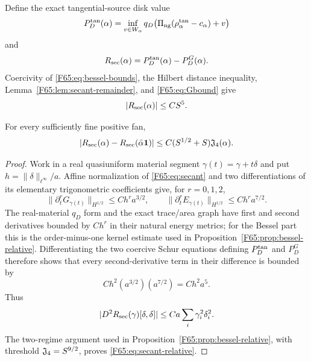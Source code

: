Define the exact tangential-source disk value
\begin{equation}\label{F65:eq:PDtan}
 P_D^{\rm tan}(\alpha)
 =\inf_{v\in W_\alpha}
 q_D\bigl(\Pi_{\rm ng}(\rho_\alpha^{\rm tan}-c_\alpha)+v\bigr)
\end{equation}
and
\begin{equation}
 R_{\rm sec}(\alpha)=P_D^{\rm tan}(\alpha)-P_D^G(\alpha).
\end{equation}
Coercivity of \eqref{F65:eq:bessel-bounds}, the Hilbert distance inequality,
Lemma~\ref{F65:lem:secant-remainder}, and \eqref{F65:eq:Gbound} give
\begin{equation}\label{F65:eq:secant-absolute}
 |R_{\rm sec}(\alpha)|\le CS^5.
\end{equation}

\begin{lemma}\label{F65:lem:secant-relative}
For every sufficiently fine positive fan,
\begin{equation}\label{F65:eq:secant-relative}
 |R_{\rm sec}(\alpha)-R_{\rm sec}(\bar\alpha\mathbf1)|
 \le C(S^{1/2}+S)\mathfrak J_4(\alpha).
\end{equation}
\end{lemma}

\begin{proof}
Work in a real quasiuniform material segment
$\gamma(t)=\gamma+t\delta$ and put
$h=\|\delta\|_{\ell^\infty}/a$.  Affine normalization of
\eqref{F65:eq:secant} and two differentiations of its elementary trigonometric
coefficients give, for $r=0,1,2$,
\begin{equation}
 \|\partial_t^rG_{\gamma(t)}\|_{H^{1/2}}
 \le Ch^ra^{3/2},
 \qquad
 \|\partial_t^rE_{\gamma(t)}\|_{H^{1/2}}
 \le Ch^ra^{7/2}.
\end{equation}
The real-material $q_D$ form and the exact trace/area graph have first and
second derivatives bounded by $Ch^r$ in their natural energy metrics; for
the Bessel part this is the order-minus-one kernel estimate used in
Proposition~\ref{F65:prop:bessel-relative}.  Differentiating the two coercive
Schur equations defining $P_D^{\rm tan}$ and $P_D^G$ therefore shows that
every second-derivative term in their difference is bounded by
\begin{equation}
 Ch^2(a^{3/2})(a^{7/2})=Ch^2a^5.
\end{equation}
Thus
\begin{equation}
 |D^2R_{\rm sec}(\gamma)[\delta,\delta]|
 \le Ca\sum_i\gamma_i^2\delta_i^2.
\end{equation}
The two-regime argument used in Proposition~\ref{F65:prop:bessel-relative},
with threshold $\mathfrak J_4=S^{9/2}$, proves \eqref{F65:eq:secant-relative}.
\end{proof}

